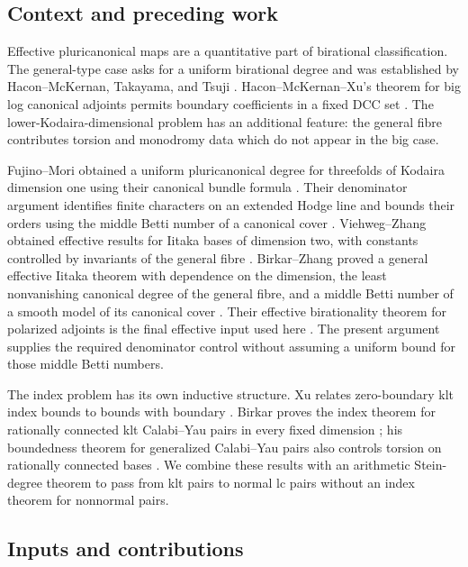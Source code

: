 \subsection{Context and preceding work}

Effective pluricanonical maps are a quantitative part of birational
classification. The general-type case asks for a uniform birational
degree and was established by Hacon--McKernan, Takayama, and Tsuji
\cite{HaconMcKernan2006,Takayama2006,Tsuji2007}.
Hacon--McKernan--Xu's theorem for big log canonical adjoints permits
boundary coefficients in a fixed DCC set \cite[Theorem~1.3]{HMX2014}.
The lower-Kodaira-dimensional problem has an additional feature:
the general fibre contributes torsion and monodromy data which do not
appear in the big case.

Fujino--Mori obtained a uniform pluricanonical degree for threefolds
of Kodaira dimension one using their canonical bundle formula
\cite[Corollary~6.2]{FujinoMori2000}. Their denominator argument
identifies finite characters on an extended Hodge line and bounds
their orders using the middle Betti number of a canonical cover
\cite[Theorem~3.1 and Sections~3.6--3.8]{FujinoMori2000}.
Viehweg--Zhang obtained effective results for Iitaka bases of dimension
two, with constants controlled by invariants of the general fibre
\cite[Theorem~0.2]{ViehwegZhang2009}. Birkar--Zhang proved a general
effective Iitaka theorem with dependence on the dimension, the least
nonvanishing canonical degree of the general fibre, and a middle Betti
number of a smooth model of its canonical cover
\cite[Theorem~1.2]{BirkarZhang2016}. Their effective birationality theorem
for polarized adjoints is the final effective input used here
\cite[Theorem~1.3]{BirkarZhang2016}. The present argument supplies the
required denominator control without assuming a uniform bound for
those middle Betti numbers.

The index problem has its own inductive structure. Xu relates
zero-boundary klt index bounds to bounds with boundary
\cite[Theorem~1.8]{Xu2019}. Birkar proves the index theorem for rationally
connected klt Calabi--Yau pairs in every fixed dimension
\cite[Corollary~1.8]{Birkar2025}; his boundedness theorem for generalized
Calabi--Yau pairs also controls torsion on rationally connected bases
\cite[Theorem~1.7]{Birkar2025}. We combine these results with an arithmetic
Stein-degree theorem \cite[Main Theorem]{SD} to pass from klt pairs to
normal lc pairs without an index theorem for nonnormal pairs.

\subsection{Inputs and contributions}


